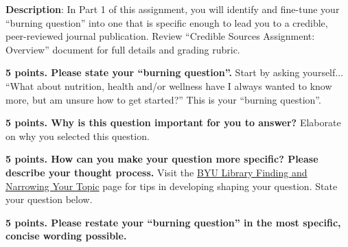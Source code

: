 \documentclass[title={Credible Sources - Formulate Question},points={20}]{fdsn201homework}
\begin{document}
\maketitle

\noindent%
\textbf{Description}: In Part 1 of this assignment, you will identify and fine-tune your ``burning question'' into one that is specific enough to lead you to a credible, peer-reviewed journal publication.
Review ``Credible Sources Assignment: Overview'' document for full details and grading rubric.

\begin{problems}
	\item \textbf{5 points. Please state your ``burning question''.}
	Start by asking yourself$\dots$ ``What about nutrition, health and/or wellness have I always wanted to know more, but am unsure how to get started?''
	This is your ``burning question''.
	\item \textbf{5 points. Why is this question important for you to answer?}
	Elaborate on why you selected this question.
	\item \textbf{5 points. How can you make your question more specific?
	Please describe your thought process.}
	Visit the \href{https://guides.lib.byu.edu/c.php?g=216340&p=1428396}{BYU Library Finding and Narrowing Your Topic} page for tips in developing shaping your question.
	State your question below.
	\item \textbf{5 points. Please restate your ``burning question'' in the most specific, concise wording possible.}
\end{problems}
\end{document}
